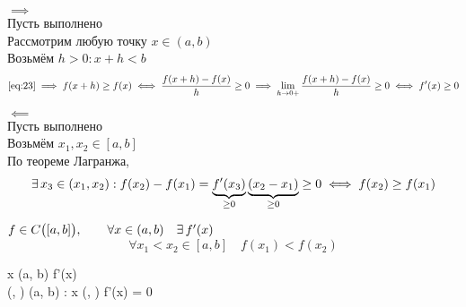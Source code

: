 \begin{iproof}
	\item $ \implies $ \\
    Пусть выполнено  \\
    Рассмотрим любую точку $ x \in (a, b) $ \\
    Возьмём $ h > 0 : x + h < b $
    $$ \eref{23} \implies f(x + h) \ge f(x) \iff \frac{f(x + h) - f(x)}h \ge 0 \implies \lim_{h \to 0+} \frac{f(x + h) - f(x)}h \ge 0 \iff f'(x) \ge 0 $$
    \item $ \impliedby $ \\
    Пусть выполнено  \\
    Возьмём $ x_1, x_2 \in [a, b] $ \\
    По теореме Лагранжа,
    $$ \exists\, x_3 \in (x_1, x_2) : f(x_2) - f(x_1) = \underbrace{f'(x_3)}_{\ge 0}\underbrace{(x_2 - x_1)}_{\ge 0} \ge 0 \iff f(x_2) \ge f(x_1) $$
\end{iproof}

\begin{theorem}
    $ f \in C \big( [a, b] \big), \qquad \forall x \in (a, b) \quad \exists\, f'(x) $
    $$ \forall x_1 < x_2 \in [a, b] \quad f(x_1) < f(x_2) $$
    \begin{mequ}[\iff \empheqlbrace]
         \forall x \in (a, b) \quad f'(x)  \\
         \not\exist (\alpha, \beta) \sub (a, b) : \forall x \in (\alpha, \beta) \quad f'(x) = 0
    \end{mequ}
\end{theorem}

